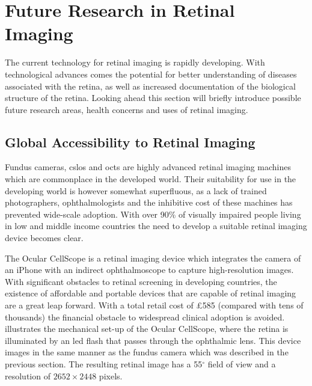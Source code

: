 
\chapter{Future Research in Retinal Imaging}

\label{future_research}

The current technology for retinal imaging is rapidly developing.
With technological advances comes the potential for better
understanding of diseases associated with the retina, as well as
increased documentation of the biological structure of the retina.
Looking ahead this section will briefly introduce possible future
research areas, health concerns and uses of retinal imaging.

\section {Global Accessibility to Retinal Imaging}

Fundus cameras, \gls{cslo}s and \Gls{oct}s are
highly advanced retinal imaging machines which are commonplace in the
developed world. Their suitability for use in the developing world is
however somewhat superfluous, as a lack of trained photographers,
ophthalmologists and the inhibitive cost of these machines has prevented
wide-scale adoption. With over 90\% of visually impaired people living
in low and middle income countries the need to develop a suitable
retinal imaging device becomes clear.\cite{burgess2013diabetic}

The Ocular CellScope is a retinal imaging device which integrates the
camera of an iPhone with an indirect ophthalmoscope to capture
high-resolution images. With significant obstacles to retinal screening
in developing countries, the existence of affordable and portable devices that are
capable of retinal imaging are a great leap forward. With a total retail
cost of \pounds585 (compared with tens of thousands) the financial obstacle
to widespread clinical adoption is avoided.  illustrates
the mechanical set-up of the Ocular CellScope, where the retina is
illuminated by an \Gls{led} flash that passes through the ophthalmic lens.
This device images in the same manner as the fundus camera which was
described in the previous section. The resulting retinal image has a 55$^\circ$ field of
view and a resolution of $2652\times2448$ pixels. \cite{medscape}

